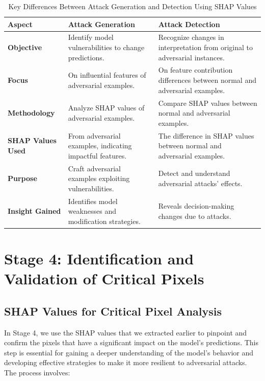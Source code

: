 \documentclass[10pt, conference, a4paper, final]{IEEEtran}
\begin{document}
\begin{table}[h]
    \centering
    \begin{tabular}{|p{1.5cm}|p{2.5cm}|p{2.5cm}|}
    \hline
    \textbf{Aspect} & \textbf{Attack Generation} & \textbf{Attack Detection} \\ \hline
    \textbf{Objective} & Identify model vulnerabilities to change predictions. & Recognize changes in interpretation from original to adversarial
     instances. \\ \hline
    \textbf{Focus} & On influential features of adversarial examples. & On feature contribution differences between normal and adversarial 
    examples. \\ \hline
    \textbf{Methodology} & Analyze SHAP values of adversarial examples. & Compare SHAP values between normal and adversarial examples. \\ \hline
    \textbf{SHAP Values Used} & From adversarial examples, indicating impactful features. & The difference in SHAP values between normal 
    and adversarial examples. \\ \hline
    \textbf{Purpose} & Craft adversarial examples exploiting vulnerabilities. & Detect and understand adversarial attacks' effects. \\ \hline
    \textbf{Insight Gained} & Identifies model weaknesses and modification strategies. & Reveals decision-making changes due to attacks. \\ \hline
   
\end{tabular}
    \caption{Key Differences Between Attack Generation and Detection Using SHAP Values}
    \label{table:attack-gen-det}
    \end{table}
    
    \section{Stage 4: Identification and Validation of Critical Pixels}

    \subsection{SHAP Values for Critical Pixel Analysis}
    In Stage 4, we use the SHAP values that we extracted earlier to pinpoint and confirm the pixels that have a significant impact on the 
    model's predictions. This step is essential for gaining a deeper understanding of the model's behavior and developing effective strategies 
    to make it more resilient to adversarial attacks.
    The process involves:
\end{document}
